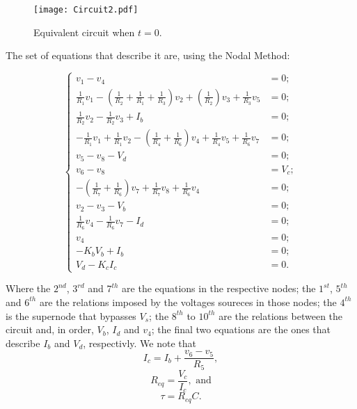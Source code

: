\begin{figure}[h] \centering
\texttt{[image: Circuit2.pdf]}
\caption{Equivalent circuit when $t=0$.}
\label{fig:Circuit_Passo2}
\end{figure}

The set of equations that describe it are, using the Nodal Method:

\begin{equation}
\begin{cases}
	v_1 - v_4 &= 0;																				  	  \\
	\frac{1}{R_1}v_1 - (\frac{1}{R_2}+\frac{1}{R_1}+\frac{1}{R_3})v_2 + (\frac{1}{R_2})v_3 + \frac{1}{R_3}v_5 &= 0; \\
  	\frac{1}{R_2}v_2 - \frac{1}{R_2}v_3+ I_b &= 0;													  \\
  	-\frac{1}{R_1}v_1 + \frac{1}{R_1}v_2 - (\frac{1}{R_4}+\frac{1}{R_6})v_4 + \frac{1}{R_4}v_5 + \frac{1}{R_6}v_7 &= 0;			  																	  \\
	v_5 - v_8 - V_d &= 0;																			  \\
  	v_6 - v_8  &= V_c;											  	  							  \\
  	-(\frac{1}{R_7}+\frac{1}{R_6})v_7 + \frac{1}{R_7}v_8 + \frac{1}{R_6}v_4 &= 0;					  \\
	v_2 - v_3 - V_b &= 0;																			  \\
  	\frac{1}{R_6}v_4 - \frac{1}{R_6}v_7 - I_d &= 0;													  \\
  	v_4 &= 0;																						  \\
  	-K_bV_b + I_b &= 0;																				  \\
  	V_d - K_cI_c &= 0.
\end{cases}
\end{equation}

Where the $2^{nd}$, $3^{rd}$ and $7^{th}$ are the equations in the respective nodes; the $1^{st}$, $5^{th}$ and $6^{th}$ are the relations imposed by the voltages soureces in those nodes; the $4^{th}$ is the supernode that bypasses $V_s$; the $8^{th}$ to $10^{th}$ are the relations between the circuit and, in order, $V_b$, $I_d$ and $v_4$; the final two equations are the ones that describe $I_b$ and $V_d$, respectivly. 
We note that 
\begin{equation}
	I_c = I_b + \frac{v_6-v_5}{R_5},
\end{equation}
\begin{equation}
	R_{eq} = \frac{V_c}{I_c}, \text{ and}
\end{equation}
\begin{equation}
	\tau = R_{eq}C.
\end{equation}


